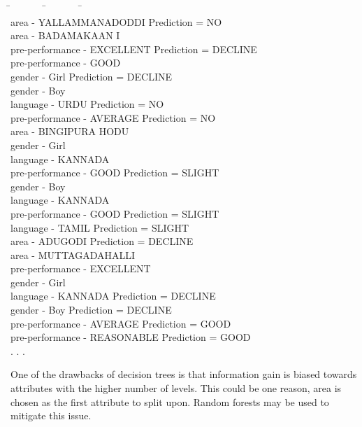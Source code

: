 \documentclass[10pt]{article}
\begin{document}
\begin{tabbing}
\label{DecisionTreeFragment}
 \= ~~~~~~ \= ~~~~~~ \= ~~~~~ \= \\
\> area - YALLAMMANADODDI Prediction = NO \\
\> area - BADAMAKAAN I  \\
\> \> pre-performance - EXCELLENT Prediction = DECLINE \\
\> \> pre-performance - GOOD  \\
\> \> \> gender - Girl Prediction = DECLINE \\
\> \> \> gender - Boy  \\
\> \> \> \> language - URDU Prediction = NO \\
\> \> pre-performance - AVERAGE Prediction = NO \\
\> area - BINGIPURA HODU  \\
\> \> gender - Girl  \\
\> \> \> language - KANNADA  \\
\> \> \> \> pre-performance - GOOD Prediction = SLIGHT \\
\> \> gender - Boy  \\
\> \> \> language - KANNADA  \\
\> \> \> \> pre-performance - GOOD Prediction = SLIGHT \\
\> \> \> language - TAMIL Prediction = SLIGHT \\
\> area - ADUGODI Prediction = DECLINE \\
\> area - MUTTAGADAHALLI  \\
\> \> pre-performance - EXCELLENT  \\
\> \> \> gender - Girl  \\
\> \> \> \> language - KANNADA Prediction = DECLINE \\
\> \> \> gender - Boy Prediction = DECLINE \\
\> \> pre-performance - AVERAGE Prediction = GOOD \\
\> \> pre-performance - REASONABLE Prediction = GOOD \\
. . .
\end{tabbing}
One of the drawbacks of decision trees is that information gain is biased towards attributes with the higher number of levels. This could be one reason, area is chosen as the first attribute to split upon. Random forests may be used to mitigate this issue.
\end{document}
